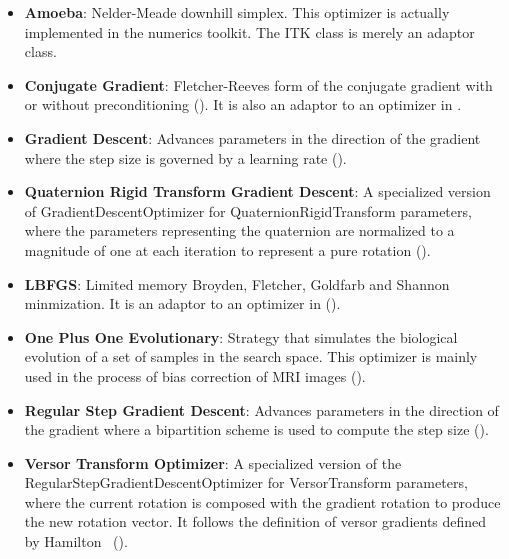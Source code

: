 \begin{itemize}

\item \textbf{Amoeba}: Nelder-Meade downhill simplex.  This optimizer is
actually implemented in the  numerics toolkit.  The ITK class
 is merely an adaptor class.

\item \textbf{Conjugate Gradient}: Fletcher-Reeves form 
of the conjugate gradient with or without preconditioning
(). It is also an adaptor to an optimizer in
.

\item \textbf{Gradient Descent}: Advances parameters in the direction of the
gradient where the step size is governed by a learning rate (). 

\item \textbf{Quaternion Rigid Transform Gradient Descent}: 
A specialized version of GradientDescentOptimizer for
QuaternionRigidTransform parameters, where the parameters representing
the quaternion are normalized to a magnitude of one at each iteration to
represent a pure rotation ().

\item \textbf{LBFGS}: Limited memory Broyden, Fletcher, Goldfarb
and Shannon minmization. It is an adaptor to an optimizer in 
().

\item \textbf{One Plus One Evolutionary}: Strategy that simulates the
biological evolution of a set of samples in the search space. This optimizer
is mainly used in the process of bias correction of MRI images
().

\item \textbf{Regular Step Gradient Descent}: Advances parameters in the
direction of the gradient where a bipartition scheme is used to compute
the step size (). 

\item \textbf{Versor Transform Optimizer}: A specialized version of the 
RegularStepGradientDescentOptimizer for VersorTransform
parameters, where the current rotation is composed with the gradient rotation
to produce the new rotation vector. It follows the definition of versor
gradients defined by Hamilton~\cite{Hamilton1866}
().

\end{itemize}

